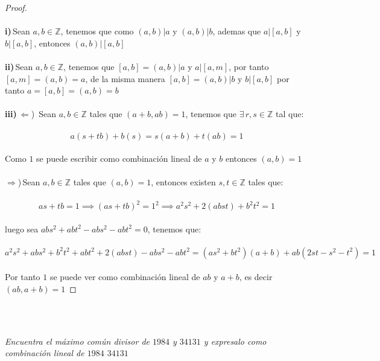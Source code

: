 \documentclass[11pt,letterpaper]{article}
\newcommand{\Z}{\mathbb{Z}}
\begin{document}
\begin{proof}\,\\
    \,\\
    \textbf{i)}\,Sean $a,b\in \Z$, tenemos que como $(a,b)|a$ y $(a,b)|b$, ademas que $a|[a,b]$ y $b|[a,b]$, entonces $(a,b)|[a,b]$\,\\
    \,\\
    \textbf{ii)}\,Sean $a,b\in \Z$, tenemos que $[a,b]=(a,b)|a$ y $a|[a,m]$, por tanto $[a,m]=(a,b)=a$, de la misma manera
    $[a,b]=(a,b)|b$ y $b|[a,b]$ por tanto $a=[a,b]=(a,b)=b$\,\\
    \,\\
    \textbf{iii)}\,$\Leftarrow$)\, Sean $a,b\in \Z$ tales que $(a+b,ab)=1$, tenemos que $\exists\,r,s \in \Z$ tal que:\,\\
    \,\\
    \begin{equation*}
        a(s+tb)+b(s)=s(a+b)+t(ab)=1
    \end{equation*}\,\\
    Como $1$ se puede escribir como combinaci\'on lineal de $a$ y $b$ entonces $(a,b)=1$\,\\
    \,\\
    $\Rightarrow$)\,Sean $a,b\in \Z$ tales que $(a,b)=1$, entonces existen $s,t\in \Z$ tales que:\,\\
    \,\\
    \begin{equation*}
        as+tb=1\implies (as+tb)^2=1^2\implies a^2s^2+2(abst)+b^2t^2=1
    \end{equation*}\,\\
    luego sea $abs^2+abt^2-abs^2-abt^2=0$, tenemos que:\,\\
    \,\\
    \begin{equation*}
        a^2s^2+abs^2+b^2t^2+abt^2+2(abst)-abs^2-abt^2=(as^2+bt^2)(a+b)+ab(2st-s^2-t^2)=1
    \end{equation*}\,\\
    Por tanto $1$ se puede ver como combinaci\'on lineal de $ab$ y $a+b$, es decir $(ab,a+b)=1$
\end{proof}\,\\
\,\\
\begin{tcolorbox}[
	title = \textcolor{black}{\textcolor{white}{Problema 7}},]
\textit{
Encuentra el m\'aximo com\'un divisor de $1984$ y $34131$ y expresalo como combinaci\'on lineal de $1984$ $34131$ 
}
\end{tcolorbox}\,\\
\end{document}

